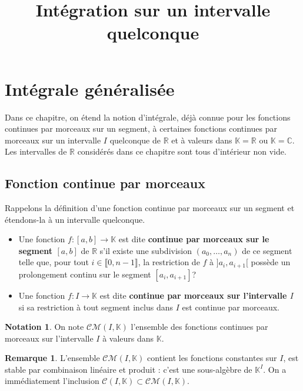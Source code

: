 \documentclass[french]{article}
\title{Intégration sur un intervalle quelconque}
\date{}
\newcommand{\R}{\mathbb{R}}
\newcommand{\C}{\mathbb{C}}
\newcommand{\K}{\mathbb{K}}
\theoremstyle{plain}
\theoremstyle{definition}
\newtheorem*{rmq}{Remarque}
\newtheorem*{notation}{Notation}
\theoremstyle{remark}
\begin{document}
\tableofcontents	

\newpage
\maketitle

\section{Intégrale généralisée}

Dans ce chapitre, on étend la notion d'intégrale, déjà connue pour les fonctions continues par morceaux sur un segment, à certaines fonctions continues par morceaux sur un intervalle $I$ quelconque de $\R$ et à valeurs dans $\K=\R$ ou $\K=\C$.\\
Les intervalles de $\R$ considérés dans ce chapitre sont tous d'intérieur non vide.

\subsection{Fonction continue par morceaux}

Rappelons la définition d'une fonction continue par morceaux sur un segment et étendons-la à un intervalle quelconque.

\begin{dfn}
	\begin{itemize}
		\item Une fonction $f:[a,b]\to\K$ est dite \textbf{continue par morceaux sur le segment $[a,b]$} de $\R$ s'il existe une subdivision $(a_0,\ldots,a_n)$ de ce segment telle que, pour tout $i\in\llbracket0,n-1\rrbracket$, la restriction de $f$ à $]a_i,a_{i+1}[$ possède un prolongement continu sur le segment $[a_i,a_{i+1}]$?
		\item Une fonction $f:I\to\K$ est dite \textbf{continue par morceaux sur l'intervalle $I$} si sa restriction à tout segment inclus dans $I$ est continue par morceaux.
	\end{itemize}
\end{dfn}

\begin{notation}
	On note $\mathcal{CM}(I,\K)$ l'ensemble des fonctions continues par morceaux sur l'intervalle $I$ à valeurs dans $\K$.
\end{notation}

\begin{rmq}
	L'ensemble $\mathcal{CM}(I,\K)$ contient les fonctions constantes sur $I$, est stable par combinaison linéaire et produit : c'est une sous-algèbre de $\K^I$. On a immédiatement l'inclusion $\mathcal{C}(I,\K)\subset\mathcal{CM}(I,\K)$.
\end{rmq}
\end{document}
